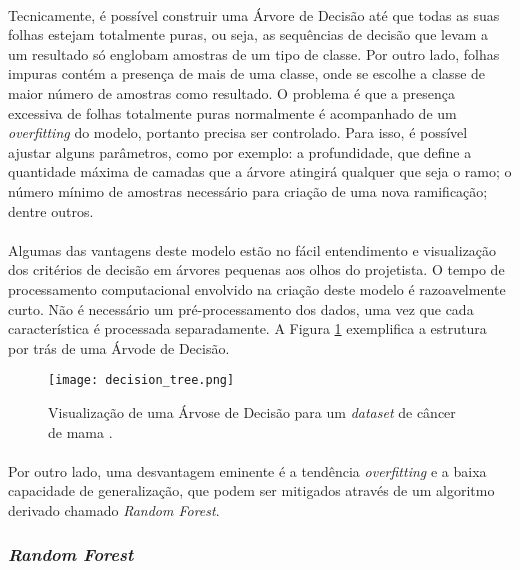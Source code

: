 \paragraph{} Tecnicamente, é possível construir uma Árvore de Decisão até que todas as suas folhas estejam totalmente puras, ou seja, as sequências de decisão que levam a um resultado só englobam amostras de um tipo de classe. Por outro lado, folhas impuras contém a presença de mais de uma classe, onde se escolhe a classe de maior número de amostras como resultado. O problema é que a presença excessiva de folhas totalmente puras normalmente é acompanhado de um \textit{overfitting} do modelo, portanto precisa ser controlado. Para isso, é possível ajustar alguns parâmetros, como por exemplo: a profundidade, que define a quantidade máxima de camadas que a árvore atingirá qualquer que seja o ramo; o número mínimo de amostras necessário para criação de uma nova ramificação; dentre outros.

\paragraph{} Algumas das vantagens deste modelo estão no fácil entendimento e visualização dos critérios de decisão em árvores pequenas aos olhos do projetista. O tempo de processamento computacional envolvido na criação deste modelo é razoavelmente curto. Não é necessário um pré-processamento dos dados, uma vez que cada característica é processada separadamente. A Figura \ref{fig:9} exemplifica a estrutura por trás de uma Árvode de Decisão.

\begin{figure}[!htb]
    \texttt{[image: decision\_tree.png]}
    \centering
    \caption{Visualização de uma Árvose de Decisão para um \textit{dataset} de câncer de mama \cite{muller2016introduction}.}
    \label{fig:9}
\end{figure}

\paragraph{} Por outro lado, uma desvantagem eminente é a tendência \textit{overfitting} e a baixa capacidade de generalização, que podem ser mitigados através de um algoritmo derivado chamado \textit{Random Forest}.


\FloatBarrier
\subsubsection*{\textit{Random Forest}}

